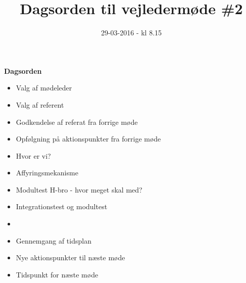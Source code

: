\documentclass{article}
\title{Dagsorden til vejledermøde \#2}
\date{29-03-2016 - kl 8.15}
\begin{document}
	\maketitle
	\textbf{Dagsorden}
	
	\begin{itemize}
		\item Valg af mødeleder
		\item Valg af referent
		\item Godkendelse af referat fra forrige møde 
		\item Opfølgning på aktionspunkter fra forrige møde
		\item Hvor er vi? 
		\item Affyringsmekanisme
		\item Modultest H-bro - hvor meget skal med? 
		\item Integrationstest og modultest
		\item 
		\item Gennemgang af tidsplan
		\item Nye aktionspunkter til næste møde
		\item Tidspunkt for næste møde
	\end{itemize}
\end{document}

